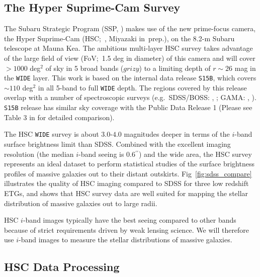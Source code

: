 \documentclass[a4paper,fleqn,usenatbib]{mnras}
\def\asec{$^{\prime\prime}$}
\begin{document}
\subsection{The Hyper Suprime-Cam Survey}
    \label{ssec:hsc}

    The Subaru Strategic Program (SSP, \citealt{HSC_SSP, HSC_DR1}) makes use of the 
    new prime-focus camera, the Hyper Suprime-Cam (HSC;~\citealt{Miyazaki2012}, 
    Miyazaki in~prep.), on the 
    8.2-m Subaru telescope at Mauna Kea. 
    The ambitious multi-layer HSC survey takes advantage of the large field of 
    view (FoV;~1.5 deg in diameter) of this camera and will cover $>1000$ deg$^2$ 
    of sky in 5 broad bands ($grizy$) to a limiting depth of $r {\sim} 26$ mag 
    in the \texttt{WIDE} layer. 
    This work is based on the internal data release \texttt{S15B}, which covers 
    ${\sim} 110$ deg$^2$ in all 5-band to full \texttt{WIDE} depth.  
    The regions covered by this release overlap with a number of spectroscopic surveys 
    (e.g.\ SDSS/BOSS: \citealt{Eisenstein2011}, \citealt{Alam2015}; 
    GAMA: \citealt{Driver2011}, \citealt{Liske2015}).
    \texttt{S15B} release has similar sky coverage with the Public Data Release 1
    (Please see Table 3 in \citealt{HSC_DR1} for detailed comparison).

    The HSC \texttt{WIDE} survey is about $3.0$-$4.0$ magnitudes deeper in terms of 
    the $i$-band surface brightness limit than SDSS. 
    Combined with the excellent imaging resolution (the median $i$-band seeing is 
    0.6\asec) and the wide area, the HSC survey represents an ideal dataset to perform 
    statistical studies of the surface brightness profiles of massive galaxies out to 
    their distant outskirts.  
    Fig~\ref{fig:sdss_compare} illustrates the quality of HSC imaging compared to SDSS 
    for three low redshift ETGs, and shows that HSC survey data are well suited for 
    mapping the stellar distribution of massive galaxies out to large radii.

	HSC $i$-band images typically have the best seeing compared to other bands because 
	of strict requirements driven by weak lensing science. 
    We will therefore use $i$-band images to measure the stellar distributions of 
    massive galaxies.
    
\subsection{HSC Data Processing}
    \label{sec:pipeline}
\end{document}
